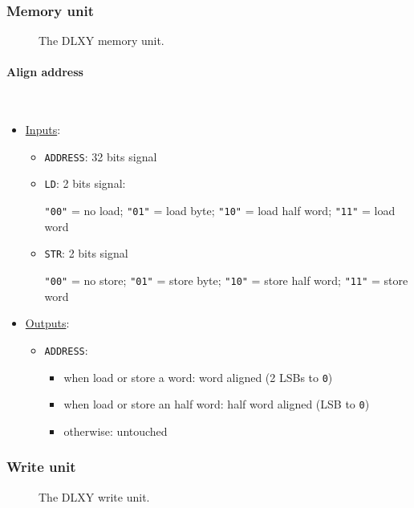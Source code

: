\subsubsection{Memory unit}
\begin{figure}[H]
	\centering
	\caption{The DLXY memory unit.}
	\label{fig:memory_unit}
\end{figure}

\paragraph{Align address} \mbox{} \\
\begin{itemize}
	\item \underline{Inputs}:
		\begin{itemize}
			\item \texttt{ADDRESS}: 32 bits signal
			\item \texttt{LD}: 2 bits signal:

				\texttt{"00"} = no load; \texttt{"01"} = load byte;
				\texttt{"10"} = load half word; \texttt{"11"} = load word
			\item \texttt{STR}: 2 bits signal

				\texttt{"00"} = no store; \texttt{"01"} = store byte;
				\texttt{"10"} = store half word; \texttt{"11"} = store word
		\end{itemize}
	\item \underline{Outputs}:
		\begin{itemize}
			\item \texttt{ADDRESS}:
				\begin{itemize}
					\item when load or store a word: word aligned (2 LSBs to \texttt{0})
					\item when load or store an half word: half word aligned (LSB to \texttt{0})
					\item otherwise: untouched
				\end{itemize}
		\end{itemize}
\end{itemize}

\subsubsection{Write unit}
\begin{figure}[H]
	\centering
	\caption{The DLXY write unit.}
	\label{fig:write_unit}
\end{figure}

